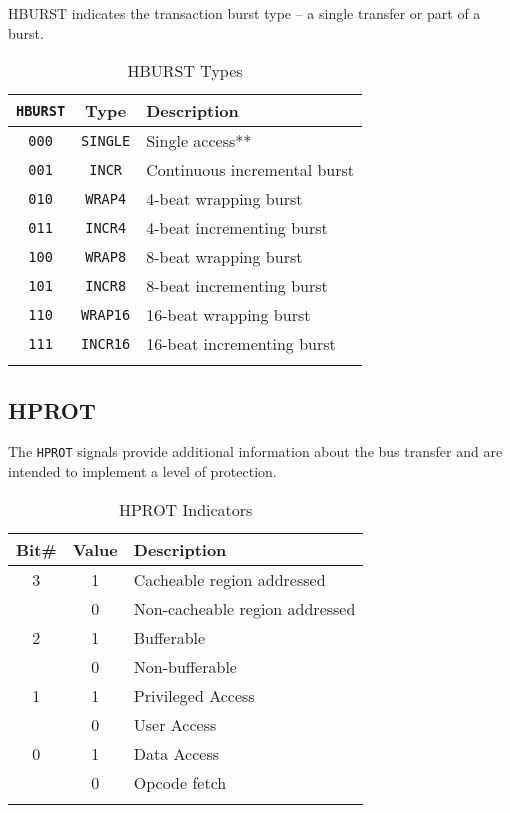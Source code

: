 HBURST indicates the transaction burst type -- a single transfer or part
of a burst.

\begin{longtable}[c]{@{\extracolsep{\fill}}ccl}	
	\toprule 
	\textbf{\texttt{HBURST}} & \textbf{Type} & \textbf{Description}\\
	\midrule
	\endhead 
	\texttt{000} & \texttt{SINGLE} & Single access**\\
	\texttt{001} & \texttt{INCR}   & Continuous incremental burst\\
	\texttt{010} & \texttt{WRAP4}  & 4-beat wrapping burst\\
	\texttt{011} & \texttt{INCR4}  & 4-beat incrementing burst\\
	\texttt{100} & \texttt{WRAP8}  & 8-beat wrapping burst\\
	\texttt{101} & \texttt{INCR8}  & 8-beat incrementing burst\\
	\texttt{110} & \texttt{WRAP16} & 16-beat wrapping burst\\
	\texttt{111} & \texttt{INCR16} & 16-beat incrementing burst\\
	\bottomrule 	
	\caption{HBURST Types}
	\label{tab:HBURST}
\end{longtable}

\subsection{HPROT}

The \texttt{HPROT} signals provide additional information about the bus
transfer and are intended to implement a level of protection.

\begin{longtable}[c]{@{}ccl}	
	\toprule 
	\textbf{Bit\#} & \textbf{Value} & \textbf{Description}\\
	\midrule
	\endhead 
	3 & 1 & Cacheable region addressed\\
	& 0 & Non-cacheable region addressed\\
	2 & 1 & Bufferable\\
	& 0 & Non-bufferable\\
	1 & 1 & Privileged Access\\
	& 0 & User Access\\
	0 & 1 & Data Access\\
	& 0 & Opcode fetch\\
	\bottomrule 	
	\caption{HPROT Indicators}
	\label{tab:HPROT}
\end{longtable}


